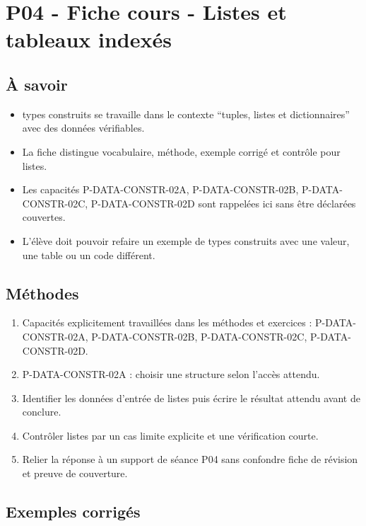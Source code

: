 \section{P04 - Fiche cours - Listes et tableaux indexés}

\subsection{À savoir}

\begin{itemize}
\tightlist
\item
  types construits se travaille dans le contexte ``tuples, listes et
  dictionnaires'' avec des données vérifiables.
\item
  La fiche distingue vocabulaire, méthode, exemple corrigé et contrôle
  pour listes.
\item
  Les capacités P-DATA-CONSTR-02A, P-DATA-CONSTR-02B, P-DATA-CONSTR-02C,
  P-DATA-CONSTR-02D sont rappelées ici sans être déclarées couvertes.
\item
  L'élève doit pouvoir refaire un exemple de types construits avec une
  valeur, une table ou un code différent.
\end{itemize}

\subsection{Méthodes}

\begin{enumerate}
\def\labelenumi{\arabic{enumi}.}
\tightlist
\item
  Capacités explicitement travaillées dans les méthodes et exercices :
  P-DATA-CONSTR-02A, P-DATA-CONSTR-02B, P-DATA-CONSTR-02C,
  P-DATA-CONSTR-02D.
\item
  P-DATA-CONSTR-02A : choisir une structure selon l'accès attendu.
\item
  Identifier les données d'entrée de listes puis écrire le résultat
  attendu avant de conclure.
\item
  Contrôler listes par un cas limite explicite et une vérification
  courte.
\item
  Relier la réponse à un support de séance P04 sans confondre fiche de
  révision et preuve de couverture.
\end{enumerate}

\subsection{Exemples corrigés}

